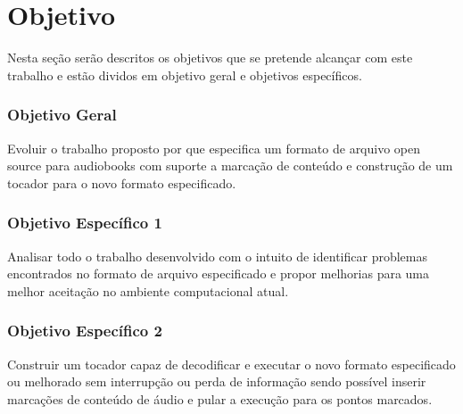 \chapter{Objetivo}\label{cap2}

Nesta seção serão descritos os objetivos que se pretende alcançar com este trabalho e estão dividos em objetivo geral e objetivos específicos.

\subsection{Objetivo Geral}

Evoluir o trabalho proposto por \cite{herbert} que especifica um formato de arquivo open source para audiobooks com suporte a marcação de conteúdo e construção de um tocador para o novo formato especificado.

\subsection{Objetivo Específico 1}

Analisar todo o trabalho desenvolvido com o intuito de identificar problemas encontrados no formato de arquivo especificado e propor melhorias para uma melhor aceitação no ambiente computacional atual.

\subsection{Objetivo Específico 2}

Construir um tocador capaz de decodificar e executar o novo formato especificado ou melhorado sem interrupção ou perda de informação sendo possível inserir marcações de conteúdo de áudio e pular a execução para os pontos marcados.
